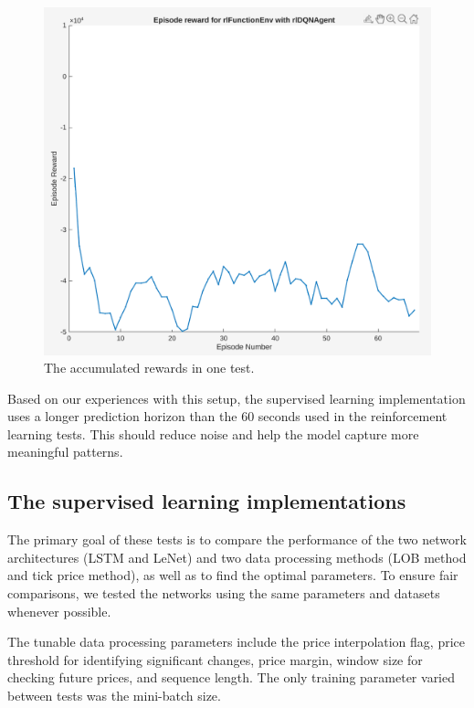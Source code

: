 \documentclass[a4paper,oneside,onecolumn,12pt]{book}
\begin{document}
	\begin{figure}[H]
	\begin{center}
		\includegraphics[width=\linewidth]{kep/RL1_episode_rewards.png}
		\caption{The accumulated rewards in one test.}
		\label{fig:rl_episode_rewards}
	\end{center}
	\end{figure}
	
	Based on our experiences with this setup, the supervised learning implementation uses a longer prediction horizon than the 60 seconds used in the reinforcement learning tests. This should reduce noise and help the model capture more meaningful patterns.

	\subsection{The supervised learning implementations}
	The primary goal of these tests is to compare the performance of the two network architectures (LSTM and LeNet) and two data processing methods (LOB method and tick price method), as well as to find the optimal parameters. To ensure fair comparisons, we tested the networks using the same parameters and datasets whenever possible.

	The tunable data processing parameters include the price interpolation flag, price threshold for identifying significant changes, price margin, window size for checking future prices, and sequence length. The only training parameter varied between tests was the mini-batch size.
\end{document}
